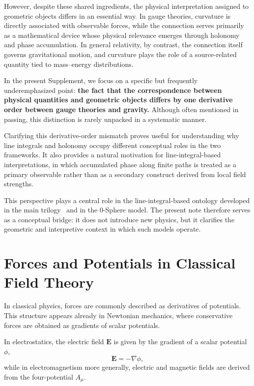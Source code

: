 \documentclass[12pt,letterpaper]{article} %
\begin{document}
However, despite these shared ingredients, the physical interpretation assigned to geometric objects differs in an essential way. In gauge theories, curvature is directly associated with observable forces, while the connection serves primarily as a mathematical device whose physical relevance emerges through holonomy and phase accumulation. In general relativity, by contrast, the connection itself governs gravitational motion, and curvature plays the role of a source-related quantity tied to mass--energy distributions.

In the present Supplement, we focus on a specific but frequently underemphasized point: \textbf{the fact that the correspondence between physical quantities and geometric objects differs by one derivative order between gauge theories and gravity.} Although often mentioned in passing, this distinction is rarely unpacked in a systematic manner.

Clarifying this derivative-order mismatch proves useful for understanding why line integrals and holonomy occupy different conceptual roles in the two frameworks. It also provides a natural motivation for line-integral-based interpretations, in which accumulated phase along finite paths is treated as a primary observable rather than as a secondary construct derived from local field strengths.

This perspective plays a central role in the line-integral-based ontology developed in the main trilogy~\cite{hanamura18067760,hanamura18135855,hanamura18203433} and in the 0-Sphere model. The present note therefore serves as a conceptual bridge: it does not introduce new physics, but it clarifies the geometric and interpretive context in which such models operate.

\section{Forces and Potentials in Classical Field Theory}

\justifying
In classical physics, forces are commonly described as derivatives of potentials. This structure appears already in Newtonian mechanics, where conservative forces are obtained as gradients of scalar potentials.

In electrostatics, the electric field $\mathbf{E}$ is given by the gradient of a scalar potential $\phi$,
\begin{equation}
\mathbf{E} = -\nabla \phi,
\end{equation}
while in electromagnetism more generally, electric and magnetic fields are derived from the four-potential $A_\mu$.
\end{document}
